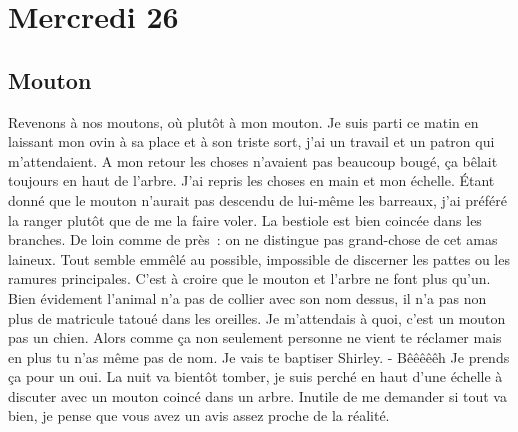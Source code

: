 ﻿\section{Mercredi 26}
\subsection{Mouton}
Revenons à nos moutons, où plutôt à mon mouton. 
Je suis parti ce matin en laissant mon ovin à sa place et à son triste sort, j’ai un travail et un patron qui m’attendaient. A mon retour les choses n’avaient pas beaucoup bougé, ça bêlait toujours en haut de l’arbre. J’ai repris les choses en main et mon échelle. Étant donné que le mouton n’aurait pas descendu de lui-même les barreaux, j’ai préféré la ranger plutôt que de me la faire voler. 
La bestiole est bien coincée dans les branches. De loin comme de près : on ne distingue pas grand-chose de cet amas laineux. Tout semble emmêlé au possible, impossible de discerner les pattes ou les ramures principales. C’est à croire que le mouton et l’arbre ne font plus qu’un. 
Bien évidement l’animal n’a pas de collier avec son nom dessus, il n’a pas non plus de matricule tatoué dans les oreilles. Je m’attendais à quoi, c’est un mouton pas un chien. Alors comme ça non seulement personne ne vient te réclamer mais en plus tu n’as même pas de nom. Je vais te baptiser Shirley.
- Bêêêêêh
Je prends ça pour un oui.
La nuit va bientôt tomber, je suis perché en haut d’une échelle à discuter avec un mouton coincé dans un arbre. Inutile de me demander si tout va bien, je pense que vous avez un avis assez proche de la réalité.
